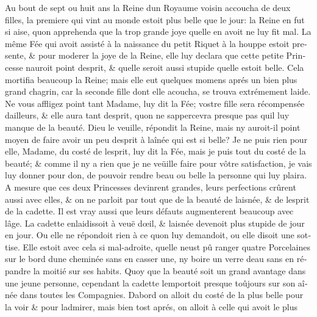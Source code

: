 \documentclass[14pt,a4paper]{memoir}
\begin{document}
\begin{otherlanguage}{french}
Au bout de sept ou huit ans la Reine d\textquotesingle un Royaume voisin
accoucha de deux filles, la premiere qui vint au monde estoit plus belle
que le jour: la Reine en fut si aise, qu\textquotesingle on apprehenda
que la trop grande joye qu\textquotesingle elle en avoit ne luy fit mal.
La même Fée qui avoit assisté à la naissance du petit Riquet à la houppe
estoit presente, \& pour moderer la joye de la Reine, elle luy declara
que cette petite Princesse n\textquotesingle auroit point
d\textquotesingle esprit, \& qu\textquotesingle elle seroit aussi
stupide qu\textquotesingle elle estoit belle. Cela mortifia beaucoup la
Reine; mais elle eut quelques momens aprés un bien plus grand chagrin,
car la seconde fille dont elle acoucha, se trouva extrémement laide. Ne
vous affligez point tant Madame, luy dit la Fée; vostre fille sera
récompensée d\textquotesingle ailleurs, \& elle aura tant
d\textquotesingle esprit, qu\textquotesingle on ne
s\textquotesingle appercevra presque pas qu\textquotesingle il luy
manque de la beauté. Dieu le veuille, répondit la Reine, mais
n\textquotesingle y auroit-il point moyen de faire avoir un peu
d\textquotesingle esprit à l\textquotesingle aînée qui est si belle? Je
ne puis rien pour elle, Madame, du costé de l\textquotesingle esprit,
luy dit la Fée, mais je puis tout du costé de la beauté; \& comme il
n\textquotesingle y a rien que je ne veüille faire pour vôtre
satisfaction, je vais luy donner pour don, de pouvoir rendre beau ou
belle la personne qui luy plaira. A mesure que ces deux Princesses
devinrent grandes, leurs perfections crûrent aussi avec elles, \& on ne
parloit par tout que de la beauté de l\textquotesingle aisnée, \& de
l\textquotesingle esprit de la cadette. Il est vray aussi que leurs
défauts augmenterent beaucoup avec l\textquotesingle âge. La cadette
enlaidissoit à veuë d\textquotesingle œil, \& l\textquotesingle aisnée
devenoit plus stupide de jour en jour. Ou elle ne répondoit rien à ce
qu\textquotesingle on luy demandoit, ou elle disoit une sottise. Elle
estoit avec cela si mal-adroite, qu\textquotesingle elle
n\textquotesingle eust pû ranger quatre Porcelaines sur le bord
d\textquotesingle une cheminée sans en casser une, ny boire un verre
d\textquotesingle eau sans en répandre la moitié sur ses habits. Quoy
que la beauté soit un grand avantage dans une jeune personne, cependant
la cadette l\textquotesingle emportoit presque toûjours sur son aînée
dans toutes les Compagnies. D\textquotesingle abord on alloit du costé
de la plus belle pour la voir \& pour l\textquotesingle admirer, mais
bien tost aprés, on alloit à celle qui avoit le plus

\end{otherlanguage}
\end{document}
